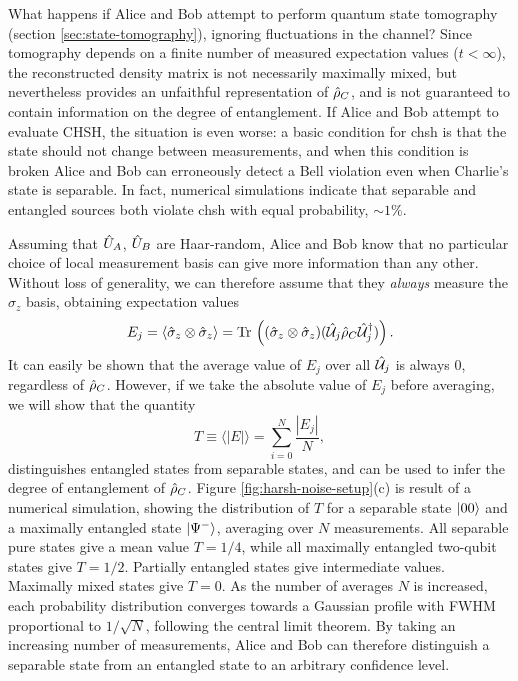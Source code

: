 What happens if Alice and Bob attempt to perform quantum state tomography (section \ref{sec:state-tomography}), ignoring fluctuations in the channel? Since tomography depends on a finite number of measured expectation values ($t<\infty$), the reconstructed density matrix is not necessarily maximally mixed, but nevertheless provides an unfaithful representation of $\hat{\rho}_C$, and is not guaranteed to contain information on the degree of entanglement. If Alice and Bob attempt to evaluate CHSH, the situation is even worse: a basic condition for \gls{chsh} is that the state should not change between measurements, and when this condition is broken Alice and Bob can erroneously detect a Bell violation even when Charlie's state is separable. In fact, numerical simulations indicate that separable and entangled sources both violate \gls{chsh} with equal probability, $\sim1\%$. 

Assuming that $\hat{U}_A$, $\hat{U}_B$ are Haar-random, Alice and Bob know that no particular choice of local measurement basis can give more information than any other. Without loss of generality, we can therefore assume that they \emph{always} measure the $\hat{\sigma}_z$ basis, obtaining expectation values
\begin{equation}
    E_j = \langle \hat{\sigma}_z \otimes \hat{\sigma}_z \rangle = \text{Tr}\, \left( (\hat{\sigma}_z \otimes \hat{\sigma}_z ) (\hat{\mathcal{U}}_j \hat{\rho}_C \hat{\mathcal{U}}_j^\dagger ) \right).
    \label{eqn:harsh-expectation-value}
\end{equation}
It can easily be shown that the average value of $E_j$ over all $\hat{\mathcal{U}}_j$ is always 0, regardless of $\hat{\rho}_C$. However, if we take the absolute value of $E_j$ before averaging, we will show that the quantity
\begin{equation}
    T \equiv \langle |E| \rangle = \sum_{i=0}^N \frac{|E_j|}{N},
    \label{eqn:define-t}
\end{equation}
distinguishes entangled states from separable states, and can be used to infer the degree of entanglement of $\hat{\rho}_C$.  Figure \ref{fig:harsh-noise-setup}(c) is result of a numerical simulation, showing the distribution of $T$ for a separable state $\mbox{$ | 00 \rangle $}$ and a maximally entangled state $\mbox{$ | \Psi^- \rangle $}$, averaging over $N$ measurements. 
All separable pure states give a mean value $T=1/4$, while all maximally entangled two-qubit states give $T=1/2$. Partially entangled states give intermediate values. Maximally mixed states give $T=0$.  As the number of averages $N$ is increased, each probability distribution converges towards a Gaussian profile with FWHM proportional to $1/\sqrt{N}$, following the central limit theorem. By taking an increasing number of measurements, Alice and Bob can therefore distinguish a separable state from an entangled state to an arbitrary confidence level.

